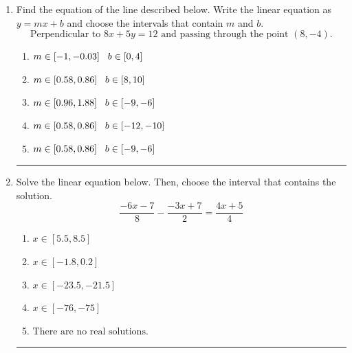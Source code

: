 \documentclass[14pt]{extbook}
\newcommand{\litem}[1]{\item#1\hspace*{-1cm}\rule{\textwidth}{0.4pt}}
\begin{document}
\begin{enumerate}
{\begin{enumerate}[label=\Alph*.]
\end{enumerate} }
\litem{
Find the equation of the line described below. Write the linear equation as $ y=mx+b $ and choose the intervals that contain $m$ and $b$.\[ \text{Perpendicular to } 8 x + 5 y = 12 \text{ and passing through the point } (8, -4). \]\begin{enumerate}[label=\Alph*.]
\item \( m \in [-1, -0.03] \hspace*{3mm} b \in [0, 4] \)
\item \( m \in [0.58, 0.86] \hspace*{3mm} b \in [8, 10] \)
\item \( m \in [0.96, 1.88] \hspace*{3mm} b \in [-9, -6] \)
\item \( m \in [0.58, 0.86] \hspace*{3mm} b \in [-12, -10] \)
\item \( m \in [0.58, 0.86] \hspace*{3mm} b \in [-9, -6] \)

\end{enumerate} }
\litem{
Solve the linear equation below. Then, choose the interval that contains the solution.\[ \frac{-6x -7}{8} - \frac{-3x + 7}{2} = \frac{4x + 5}{4} \]\begin{enumerate}[label=\Alph*.]
\item \( x \in [5.5, 8.5] \)
\item \( x \in [-1.8, 0.2] \)
\item \( x \in [-23.5, -21.5] \)
\item \( x \in [-76, -75] \)
\item \( \text{There are no real solutions.} \)

\end{enumerate} }
\end{enumerate}
\end{document}
